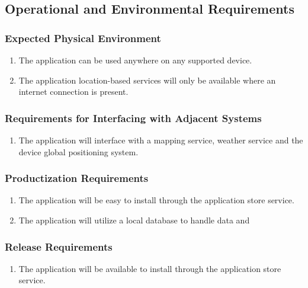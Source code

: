 \documentclass[titlepage]{article}
\begin{document}
\subsection{Operational and Environmental Requirements}
\label{sub:operational_and_environmental_requirements}

\subsubsection{Expected Physical Environment}
\label{ssub:expected_physical_environment}
\begin{enumerate}[{OE}1. ]
	\item The application can be used anywhere on any supported device.
    \item The application location-based services will only be available where an internet
    connection
    is present.
\end{enumerate}

\subsubsection{Requirements for Interfacing with Adjacent Systems}
\label{ssub:requirements_for_interfacing_with_adjacent_systems}
\begin{enumerate}[{OE}1. ]
    \item The application will interface with a mapping service, weather service and the device
    global positioning system.
\end{enumerate}

\subsubsection{Productization Requirements}
\label{ssub:productization_requirements}
\begin{enumerate}[{OE}1. ]
	\item The application will be easy to install through the application store service.
	\item The application will utilize a local database to handle data and 
\end{enumerate}

\subsubsection{Release Requirements}
\label{ssub:release_requirements}
\begin{enumerate}[{OE}1. ]
	\item The application will be available to install through the application store service.
\end{enumerate}
\end{document}
